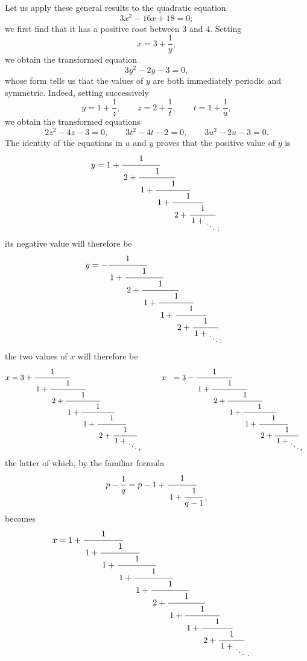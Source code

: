 Let us apply these general results to the quadratic equation
\[
3x^{2} - 16x + 18 = 0;
\]
we first find that it has a positive root between $3$ and $4$. Setting
\[
x = 3 + \frac{1}{y},
\]
we obtain the transformed equation
\[
3y^{2} - 2y - 3 = 0,
\]
whose form tells us that the values of $y$ are both immediately periodic and
symmetric. Indeed, setting successively
\[
y = 1 + \frac{1}{z}, \qquad
z = 2 + \frac{1}{t}, \qquad
t = 1 + \frac{1}{u},
\]
we obtain the transformed equations
\[
2z^{2} - 4z - 3 = 0, \qquad
3t^{2} - 4t - 2 = 0, \qquad
3u^{2} - 2u - 3 = 0.
\]
The identity of the equations in $u$ and $y$ proves that the positive value
%
of $y$ is
\[
  y =   1 + \GalCfrac{1}{
      \,2 + \GalHlap{$\cfrac{1}{
      \,1 + \GalHlap{$\cfrac{1}{
      \,1 + \GalHlap{$\cfrac{1}{
      \,2 + \GalHlap{$\cfrac{1}{
      \,1 + \raisebox{-2ex}{$\ddots$\rlap{\,;}} }$}}\;$}}\;$}}\;$}}
\GalCfracCorrect
\]
its negative value will therefore be
\[
  y =     - \GalCfrac{1}{
      \,1 + \GalHlap{$\cfrac{1}{
      \,2 + \GalHlap{$\cfrac{1}{
      \,1 + \GalHlap{$\cfrac{1}{
      \,1 + \GalHlap{$\cfrac{1}{
      \,2 + \GalHlap{$\cfrac{1}{
      \,1 + \raisebox{-2ex}{$\ddots$\rlap{\,;}} }$}}\;$}}\;$}}\;$}}\;$}}
\GalCfracCorrect
\]
the two values of $x$ will therefore be
\[
\begin{aligned}
  x &= 3 + \GalCfrac{1}{
      \,1 + \GalHlap{$\cfrac{1}{
      \,2 + \GalHlap{$\cfrac{1}{
      \,1 + \GalHlap{$\cfrac{1}{
      \,1 + \GalHlap{$\cfrac{1}{
      \,2 + \GalHlap{$\cfrac{1}{
      \,1 + \raisebox{-2ex}{$\ddots$\rlap{\,,}} }$}}\;$}}\;$}}\;$}}\;$}}
\GalCfracCorrect
\qquad
  x &= \GalPrintedError{3 - \GalCfrac{1}{
      \,1 + \GalHlap{$\cfrac{1}{
      \,2 + \GalHlap{$\cfrac{1}{
      \,1 + \GalHlap{$\cfrac{1}{
      \,1 + \GalHlap{$\cfrac{1}{
      \,2 + \GalHlap{$\cfrac{1}{
      \,1 + \raisebox{-2ex}{$\ddots$\rlap{\,,}} }$}}\;$}}\;$}}\;$}}\;$}}
\GalCfracCorrect}{W03-PE003}
\end{aligned}
\]
the latter of which, by the familiar formula
\[
  p - \frac{1}{q}
= p - 1 + \GalCfrac{1}{
      \,1 + \GalHlap{$\cfrac{1}{q-1}\, ,$}}
\GalCfracCorrect
\]
becomes
\[
  x =   1 + \GalCfrac{1}{
      \,1 + \GalHlap{$\cfrac{1}{
      \,1 + \GalHlap{$\cfrac{1}{
      \,1 + \GalHlap{$\cfrac{1}{
      \,1 + \GalHlap{$\cfrac{1}{
      \,2 + \GalHlap{$\cfrac{1}{
      \,1 + \GalHlap{$\cfrac{1}{
      \,1 + \GalHlap{$\cfrac{1}{
      \,2 + \GalHlap{$\cfrac{1}{
      \,1 + \raisebox{-2ex}{$\ddots$\rlap{\ .}} }$}}\;$}}\;$}}\;$}}\;$}}\;$}}\;$}}\;$}}
\GalCfracCorrect
\]
\GalArticleEndRule
